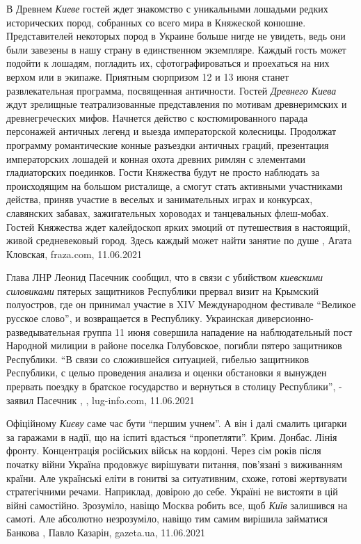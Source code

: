 В Древнем \emph{Киеве} гостей ждет знакомство с уникальными лошадьми редких
исторических пород, собранных со всего мира в Княжеской конюшне. Представителей
некоторых пород в Украине больше нигде не увидеть, ведь они были завезены в
нашу страну в единственном экземпляре. Каждый гость может подойти к лошадям,
погладить их, сфотографироваться и проехаться на них верхом или в экипаже.
Приятным сюрпризом 12 и 13 июня станет развлекательная программа, посвященная
античности. Гостей \emph{Древнего Киева} ждут зрелищные театрализованные представления
по мотивам древнеримских и древнегреческих мифов. Начнется действо с
костюмированного парада персонажей античных легенд и выезда императорской
колесницы. Продолжат программу романтические конные разъездки античных граций,
презентация императорских лошадей и конная охота древних римлян с элементами
гладиаторских поединков. Гости Княжества будут не просто наблюдать за
происходящим на большом ристалище, а смогут стать активными участниками
действа, приняв участие в веселых и занимательных играх и конкурсах, славянских
забавах, зажигательных хороводах и танцевальных флеш-мобах. Гостей Княжества
ждет калейдоскоп ярких эмоций от путешествия в настоящий, живой средневековый
город. Здесь каждый может найти занятие по душе
, Агата Кловская, fraza.com, 11.06.2021

Глава ЛНР Леонид Пасечник сообщил, что в связи с убийством \emph{киевскими силовиками}
пятерых защитников Республики прервал визит на Крымский полуостров, где он
принимал участие в XIV Международном фестивале \enquote{Великое русское слово}, и
возвращается в Республику.  Украинская диверсионно-разведывательная группа 11
июня совершила нападение на наблюдательный пост Народной милиции в районе
поселка Голубовское, погибли пятеро защитников Республики.  \enquote{В связи со
сложившейся ситуацией, гибелью защитников Республики, с целью проведения
анализа и оценки обстановки я вынужден прервать поездку в братское государство
и вернуться в столицу Республики}, - заявил Пасечник
, 
, lug-info.com, 11.06.2021

Офіційному \emph{Києву} саме час бути \enquote{першим учнем}. А він і далі
смалить цигарки за гаражами в надії, що на іспиті вдасться
\enquote{пропетляти}.  Крим. Донбас. Лінія фронту. Концентрація російських
військ на кордоні. Через сім років після початку війни Україна продовжує
вирішувати питання, пов'язані з виживанням країни. Але українські еліти в
гонитві за ситуативним, схоже, готові жертвувати стратегічними речами.
Наприклад, довірою до себе.  Україні не вистояти в цій війні самостійно.
Зрозуміло, навіщо Москва робить все, щоб \emph{Київ} залишився на самоті. Але
абсолютно незрозуміло, навіщо тим самим вирішила займатися Банкова
, 
Павло Казарін, gazeta.ua, 11.06.2021

